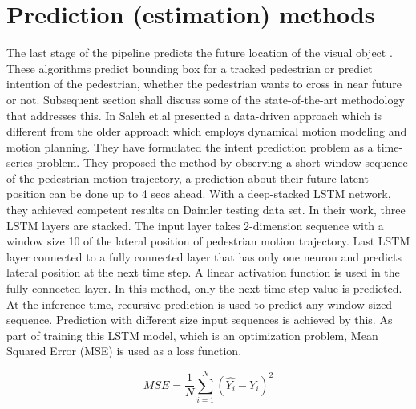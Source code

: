 \section{Prediction (estimation) methods }
The last stage of the pipeline predicts the future location of the visual object \cite{saleh2017intent, zhang2019sr, xue2018ss, lipton2015critical}. These algorithms predict bounding box for a tracked pedestrian or predict intention of the pedestrian, whether the pedestrian wants to cross in near future or not. Subsequent section shall discuss some of the state-of-the-art methodology that addresses this.
In \cite{saleh2017intent} Saleh et.al presented a data-driven approach which is different from the older approach which employs dynamical motion modeling and motion planning. They have formulated the intent prediction problem as a time-series problem. They proposed the method by observing a short window sequence of the pedestrian motion trajectory, a prediction about their future latent position can be done up to 4 secs ahead. With a deep-stacked LSTM network, they achieved competent results on Daimler testing data set. In their work, three LSTM layers are stacked. The input layer takes 2-dimension sequence with a window size 10 of the lateral position of pedestrian motion trajectory. Last LSTM layer connected to a fully connected layer that has only one neuron and predicts lateral position at the next time step. A linear activation function is used in the fully connected layer. In this method, only the next time step value is predicted. At the inference time, recursive prediction is used to predict any window-sized sequence. Prediction with different size input sequences is achieved by this.
As part of training this LSTM  model, which is an optimization problem, Mean Squared Error (MSE) is used as a loss function.

\begin{equation}
MSE= \frac{1}{N}\sum_{i=1}^{N}(\hat{Y_i} - Y_i)^2
\end{equation}

